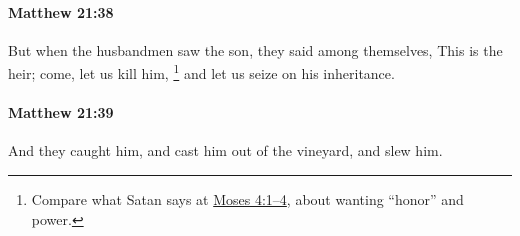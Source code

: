 		\paragraph{Matthew 21:38} %
			\label{MATTHEW-21-38}

			But when the husbandmen saw the son, they said among themselves, This is the heir; come, let us kill him,
				\footnote{%
					Compare what Satan says at \hyperref[MOSES-4-1]{Moses 4:1--4}, about wanting ``honor'' and power.
					}%
			and let us seize on his inheritance.

			\begin{framed}
			\scriptsize
				\begin{compactdesc}
					\item[SBLG] 
				\end{compactdesc}
			\end{framed}

		\paragraph{Matthew 21:39} %
			\label{MATTHEW-21-39}

			And they caught him, and cast him out of the vineyard, and slew him.

